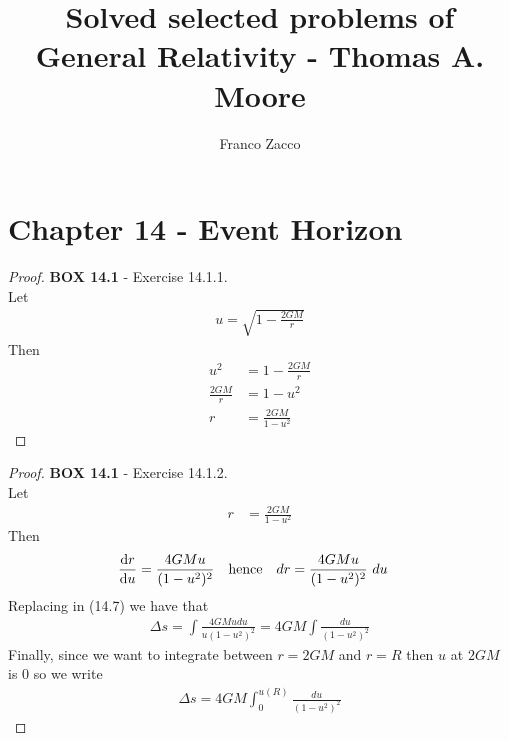 \documentclass[11pt]{article}
\title{\textbf{Solved selected problems of General Relativity - Thomas A. Moore}}
\author{Franco Zacco}
\date{}
\theoremstyle{definition}
\begin{document}
\maketitle
\thispagestyle{empty}

\section*{Chapter 14 - Event Horizon}

\begin{proof}{\textbf{BOX 14.1} - Exercise 14.1.1.}\\
Let
\begin{align*}
    u = \sqrt{1 - \frac{2GM}{r}}
\end{align*}
Then
\begin{align*}
    u^2 &= 1 - \frac{2GM}{r}\\
    \frac{2GM}{r} &= 1 - u^2\\
    r &= \frac{2GM}{1 - u^2}
\end{align*}
\end{proof}
\begin{proof}{\textbf{BOX 14.1} - Exercise 14.1.2.}\\
Let
\begin{align*}
    r &= \frac{2GM}{1 - u^2}
\end{align*}
Then
\begin{align*}
    \dv{r}{u} &= \frac{4GMu}{(1 - u^2)^2}\quad\text{hence}\quad
    dr = \frac{4GMu}{(1 - u^2)^2}~du
\end{align*}
Replacing in (14.7) we have that
\begin{align*}
    \Delta s = \int \frac{4GM u du}{u (1 - u^2)^2} = 4GM \int \frac{du}{(1 - u^2)^2}
\end{align*}
Finally, since we want to integrate between $r = 2GM$ and $r = R$ then $u$ at
$2GM$ is $0$ so we write 
\begin{align*}
    \Delta s = 4GM \int_0^{u(R)} \frac{du}{(1 - u^2)^2}
\end{align*}
\end{proof}
\end{document}
